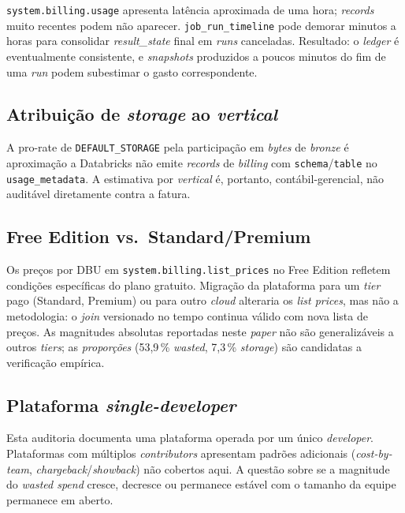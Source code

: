 \documentclass[12pt,a4paper,oneside]{article}
\begin{document}
\texttt{system.billing.usage} apresenta latência aproximada de uma
hora; \textit{records} muito recentes podem não aparecer.
\texttt{job\_run\_timeline} pode demorar minutos a horas para
consolidar \textit{result\_state} final em \textit{runs}
canceladas. Resultado: o \textit{ledger} é eventualmente
consistente, e \textit{snapshots} produzidos a poucos minutos do
fim de uma \textit{run} podem subestimar o gasto correspondente.

\subsection{Atribuição de \textit{storage} ao \textit{vertical}}

A pro-rate de \texttt{DEFAULT\_STORAGE} pela participação em
\textit{bytes} de \textit{bronze} é aproximação \textemdash{} a
Databricks não emite \textit{records} de \textit{billing} com
\texttt{schema}/\texttt{table} no \texttt{usage\_metadata}. A
estimativa por \textit{vertical} é, portanto, contábil-gerencial,
não auditável diretamente contra a fatura.

\subsection{Free Edition vs.\ Standard/Premium}

Os preços por DBU em \texttt{system.billing.list\_prices} no Free
Edition refletem condições específicas do plano gratuito. Migração
da plataforma para um \textit{tier} pago (Standard, Premium) ou
para outro \textit{cloud} alteraria os \textit{list prices}, mas
não a metodologia: o \textit{join} versionado no tempo continua
válido com nova lista de preços. As magnitudes absolutas reportadas
neste \textit{paper} não são generalizáveis a outros \textit{tiers};
as \textit{proporções} (53,9\,\% \textit{wasted}, 7,3\,\%
\textit{storage}) são candidatas a verificação empírica.

\subsection{Plataforma \textit{single-developer}}

Esta auditoria documenta uma plataforma operada por um único
\textit{developer}. Plataformas com múltiplos
\textit{contributors} apresentam padrões adicionais
(\textit{cost-by-team}, \textit{chargeback}/\textit{showback})
não cobertos aqui. A questão sobre se a magnitude do
\textit{wasted spend} cresce, decresce ou permanece estável com
o tamanho da equipe permanece em aberto.
\end{document}
